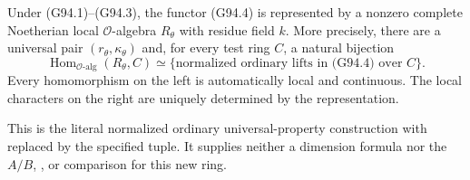 \begin{theorem}
\label{AC-G94-space}
Under (G94.1)--(G94.3), the functor (G94.4) is represented by
a nonzero complete Noetherian local \(\mathcal O\)-algebra
\(R_{\theta}\) with residue field \(k\).
More precisely, there are a universal pair
\((r_{\theta},\kappa_{\theta})\) and, for every test ring
\(C\), a natural bijection
\[
 \operatorname{Hom}_{\mathcal O\text{-alg}}(R_{\theta},C)
 \simeq
 \{\text{normalized ordinary lifts in (G94.4) over }C\}.
 \tag{G94.5}
\]
Every homomorphism on the left is automatically local and
continuous.  The local characters on the right are uniquely
determined by the representation.

This is the literal normalized ordinary universal-property
construction with  replaced by the specified
tuple.  It supplies neither a dimension formula nor the
\(A/B\), , or  comparison for this new ring.
\end{theorem}

